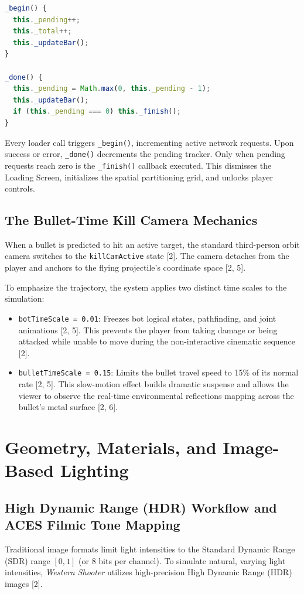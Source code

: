 \documentclass[11pt,a4paper,oneside]{article}
\begin{document}
\begin{lstlisting}[language=JavaScript, caption={Asynchronous tracking algorithm in world.js}]
_begin() {
  this._pending++;
  this._total++;
  this._updateBar();
}

_done() {
  this._pending = Math.max(0, this._pending - 1);
  this._updateBar();
  if (this._pending === 0) this._finish();
}
\end{lstlisting}
Every loader call triggers \texttt{\_begin()}, incrementing active network requests. Upon success or error, \texttt{\_done()} decrements the pending tracker. Only when pending requests reach zero is the \texttt{\_finish()} callback executed. This dismisses the Loading Screen, initializes the spatial partitioning grid, and unlocks player controls.

\subsection{The Bullet-Time Kill Camera Mechanics}
When a bullet is predicted to hit an active target, the standard third-person orbit camera switches to the \texttt{killCamActive} state [2]. The camera detaches from the player and anchors to the flying projectile's coordinate space [2, 5].

To emphasize the trajectory, the system applies two distinct time scales to the simulation:
\begin{itemize}
    \item \texttt{botTimeScale = 0.01}: Freezes bot logical states, pathfinding, and joint animations [2, 5]. This prevents the player from taking damage or being attacked while unable to move during the non-interactive cinematic sequence [2].
    \item \texttt{bulletTimeScale = 0.15}: Limits the bullet travel speed to 15\% of its normal rate [2, 5]. This slow-motion effect builds dramatic suspense and allows the viewer to observe the real-time environmental reflections mapping across the bullet's metal surface [2, 6].
\end{itemize}

\newpage
\section{Geometry, Materials, and Image-Based Lighting}
\subsection{High Dynamic Range (HDR) Workflow and ACES Filmic Tone Mapping}
Traditional image formats limit light intensities to the Standard Dynamic Range (SDR) range $[0, 1]$ (or 8 bits per channel). To simulate natural, varying light intensities, \emph{Western Shooter} utilizes high-precision High Dynamic Range (HDR) images [2].
\end{document}
